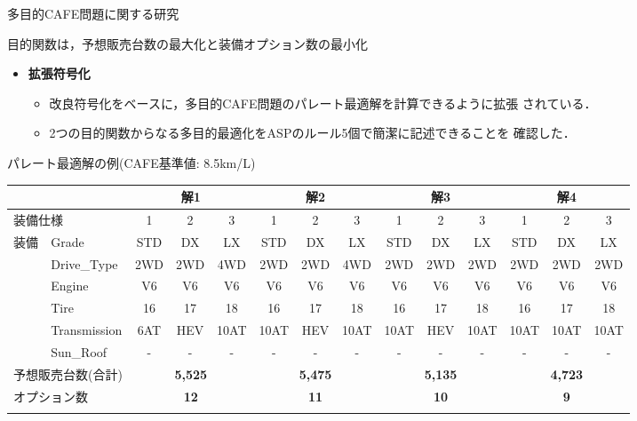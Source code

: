 \documentclass[dvipdfmx, 11pt]{beamer}
\begin{document}
\begin{frame}{多目的CAFE問題に関する研究}
 \begin{block}{}\centering
  目的関数は，予想販売台数の最大化と装備オプション数の最小化
 \end{block}
 \begin{itemize}
  \item {\bf 拡張符号化}
	\begin{itemize}
	 \item 改良符号化をベースに，多目的CAFE問題のパレート最適解を計算できるように拡張
	       されている．
	 \item 2つの目的関数からなる多目的最適化をASPのルール5個で簡潔に記述できることを
	       確認した．
	\end{itemize}
 \end{itemize}
 \begin{exampleblock}{パレート最適解の例{\normalsize (CAFE基準値: 8.5km/L)}}
    \centering
  \tiny
  \tabcolsep=1.5mm
  \begin{tabular}{l|l|c|c|c||c|c|c||c|c|c||c|c|c}
   \multicolumn{2}{l|}{} & \multicolumn{3}{c||}{解1} & \multicolumn{3}{c||}{解2} & \multicolumn{3}{c||}{解3} & \multicolumn{3}{c}{解4}\\ \hline
   \multicolumn{2}{l|}{装備仕様} & 1 & 2 & 3 & 1 & 2 & 3 & 1 & 2 & 3 & 1 & 2 & 3 \\ \hline
   装備 & Grade & STD & DX & LX & STD & DX & LX & STD & DX & LX & STD & DX & LX \\
       & Drive\_Type & 2WD & 2WD & \alert{4WD} & 2WD & 2WD & \alert{4WD} & 2WD & 2WD & \alert{2WD} & 2WD & 2WD & \alert{2WD}\\
       & Engine & V6 & V6 & V6 & V6 & V6 & V6 & V6 & V6 & V6 & V6 & V6 & V6 \\
       & Tire & 16 & 17 & 18 & 16 & 17 & 18 & 16 & 17 & 18 & 16 & 17 & 18 \\
       & Transmission & \alert{6AT} & \alert{HEV} & 10AT & \alert{10AT} & \alert{HEV} & 10AT & \alert{10AT} & \alert{HEV} & 10AT & \alert{10AT} & \alert{10AT} & 10AT \\
       & Sun\_Roof & - & - & - & - & - & - & - & - & - & - & - & - \\ \hline
   \multicolumn{2}{l|}{予想販売台数(合計)}  & \multicolumn{3}{c||}{\bf 5,525} & \multicolumn{3}{c||}{\bf 5,475} & \multicolumn{3}{c||}{\bf 5,135} & \multicolumn{3}{c}{\bf 4,723} \\ 
   \multicolumn{2}{l|}{オプション数} & \multicolumn{3}{c||}{\bf 12} & \multicolumn{3}{c||}{\bf 11} & \multicolumn{3}{c||}{\bf 10} & \multicolumn{3}{c}{\bf 9} \\
   \multicolumn{14}{c}{}
  \end{tabular}

 \end{exampleblock}
\end{frame}
\end{document}
